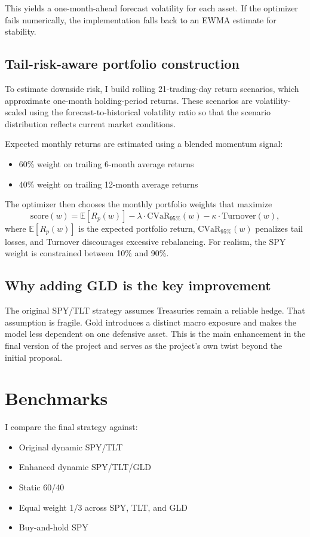\documentclass[11pt]{article}
\begin{document}
This yields a one-month-ahead forecast volatility for each asset. If the optimizer fails numerically, the implementation falls back to an EWMA estimate for stability.

\subsection{Tail-risk-aware portfolio construction}
To estimate downside risk, I build rolling 21-trading-day return scenarios, which approximate one-month holding-period returns. These scenarios are volatility-scaled using the forecast-to-historical volatility ratio so that the scenario distribution reflects current market conditions.

Expected monthly returns are estimated using a blended momentum signal:
\begin{itemize}
    \item 60\% weight on trailing 6-month average returns
    \item 40\% weight on trailing 12-month average returns
\end{itemize}

The optimizer then chooses the monthly portfolio weights that maximize
\[
\text{score}(w)=\mathbb{E}[R_p(w)]-\lambda \cdot \text{CVaR}_{95\%}(w)-\kappa \cdot \text{Turnover}(w),
\]
where \(\mathbb{E}[R_p(w)]\) is the expected portfolio return, \(\text{CVaR}_{95\%}(w)\) penalizes tail losses, and Turnover discourages excessive rebalancing. For realism, the SPY weight is constrained between 10\% and 90\%.

\subsection{Why adding GLD is the key improvement}
The original SPY/TLT strategy assumes Treasuries remain a reliable hedge. That assumption is fragile. Gold introduces a distinct macro exposure and makes the model less dependent on one defensive asset. This is the main enhancement in the final version of the project and serves as the project's own twist beyond the initial proposal.

\section{Benchmarks}
I compare the final strategy against:
\begin{itemize}
    \item Original dynamic SPY/TLT
    \item Enhanced dynamic SPY/TLT/GLD
    \item Static 60/40
    \item Equal weight 1/3 across SPY, TLT, and GLD
    \item Buy-and-hold SPY
\end{itemize}
\end{document}
